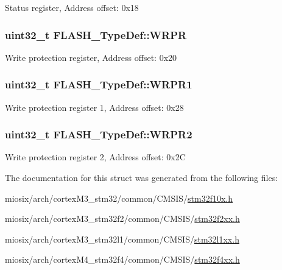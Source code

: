Status register, Address offset\-: 0x18 \hypertarget{struct_f_l_a_s_h___type_def_ac1889c0e17d868ab991f267ceb9dbb4b}{
\subsubsection[{W\-R\-P\-R}]{ uint32\-\_\-t F\-L\-A\-S\-H\-\_\-\-Type\-Def\-::\-W\-R\-P\-R}}\label{struct_f_l_a_s_h___type_def_ac1889c0e17d868ab991f267ceb9dbb4b}
Write protection register, Address offset\-: 0x20 \hypertarget{struct_f_l_a_s_h___type_def_a8f94f0938663804b2d9de2002a4e7e67}{
\subsubsection[{W\-R\-P\-R1}]{ uint32\-\_\-t F\-L\-A\-S\-H\-\_\-\-Type\-Def\-::\-W\-R\-P\-R1}}\label{struct_f_l_a_s_h___type_def_a8f94f0938663804b2d9de2002a4e7e67}
Write protection register 1, Address offset\-: 0x28 \hypertarget{struct_f_l_a_s_h___type_def_a79b0e64b11e40d304573f0b501355aab}{
\subsubsection[{W\-R\-P\-R2}]{ uint32\-\_\-t F\-L\-A\-S\-H\-\_\-\-Type\-Def\-::\-W\-R\-P\-R2}}\label{struct_f_l_a_s_h___type_def_a79b0e64b11e40d304573f0b501355aab}
Write protection register 2, Address offset\-: 0x2\-C 

The documentation for this struct was generated from the following files\-:\begin{DoxyCompactItemize}
\item 
miosix/arch/cortex\-M3\-\_\-stm32/common/\-C\-M\-S\-I\-S/\hyperlink{stm32f10x_8h}{stm32f10x.\-h}\item 
miosix/arch/cortex\-M3\-\_\-stm32f2/common/\-C\-M\-S\-I\-S/\hyperlink{stm32f2xx_8h}{stm32f2xx.\-h}\item 
miosix/arch/cortex\-M3\-\_\-stm32l1/common/\-C\-M\-S\-I\-S/\hyperlink{stm32l1xx_8h}{stm32l1xx.\-h}\item 
miosix/arch/cortex\-M4\-\_\-stm32f4/common/\-C\-M\-S\-I\-S/\hyperlink{stm32f4xx_8h}{stm32f4xx.\-h}\end{DoxyCompactItemize}
